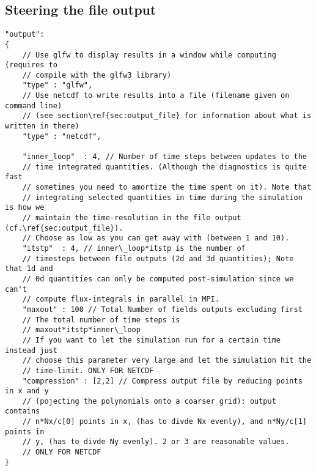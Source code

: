 \subsection{Steering the file output}

\begin{verbatim}
"output":
{
    // Use glfw to display results in a window while computing (requires to
    // compile with the glfw3 library)
    "type" : "glfw",
    // Use netcdf to write results into a file (filename given on command line)
    // (see section\ref{sec:output_file} for information about what is written in there)
    "type" : "netcdf",

    "inner_loop"  : 4, // Number of time steps between updates to the
    // time integrated quantities. (Although the diagnostics is quite fast
    // sometimes you need to amortize the time spent on it). Note that
    // integrating selected quantities in time during the simulation is how we
    // maintain the time-resolution in the file output (cf.\ref{sec:output_file}).
    // Choose as low as you can get away with (between 1 and 10).
    "itstp"  : 4, // inner\_loop*itstp is the number of
    // timesteps between file outputs (2d and 3d quantities); Note that 1d and
    // 0d quantities can only be computed post-simulation since we can't
    // compute flux-integrals in parallel in MPI.
    "maxout" : 100 // Total Number of fields outputs excluding first
    // The total number of time steps is
    // maxout*itstp*inner\_loop
    // If you want to let the simulation run for a certain time instead just
    // choose this parameter very large and let the simulation hit the
    // time-limit. ONLY FOR NETCDF
    "compression" : [2,2] // Compress output file by reducing points in x and y
    // (pojecting the polynomials onto a coarser grid): output contains
    // n*Nx/c[0] points in x, (has to divde Nx evenly), and n*Ny/c[1] points in
    // y, (has to divde Ny evenly). 2 or 3 are reasonable values.
    // ONLY FOR NETCDF
}
\end{verbatim}

